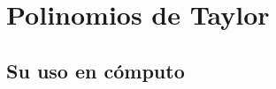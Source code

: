 \documentclass[12pt]{beamer}
\begin{document}

\section{Polinomios de Taylor}
\subsection{Su uso en cómputo}
\end{document}
